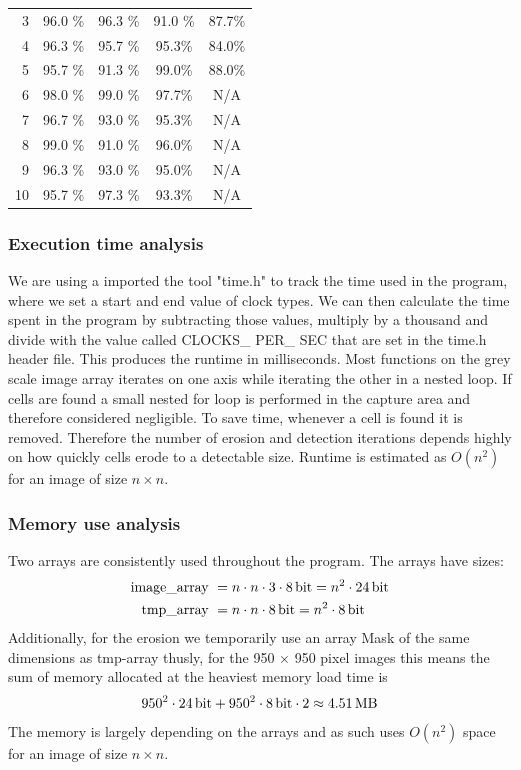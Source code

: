 \documentclass[a4paper, english]{article}
\numberwithin{equation}{section}
\begin{document}
\begin{table}[H]
\begin{subtable}[t]{.49\textwidth}
\begin{tabular}{rcccc}
            3  & 96.0 \% & 96.3 \% & 91.0 \% & 87.7\%     \\
            4  & 96.3 \% & 95.7 \% & 95.3\%  & 84.0\%     \\
            5  & 95.7 \% & 91.3 \% & 99.0\%  & 88.0\%     \\
            6  & 98.0 \% & 99.0 \% & 97.7\%  & N/A        \\
            7  & 96.7 \% & 93.0 \% & 95.3\%  & N/A        \\
            8  & 99.0 \% & 91.0 \% & 96.0\%  & N/A        \\
            9  & 96.3 \% & 93.0 \% & 95.0\%  & N/A        \\
            10 & 95.7 \% & 97.3 \% & 93.3\%  & N/A        \\
        \end{tabular}
    \end{subtable}
\end{table}
\subsubsection{Execution time analysis}
We are using a imported the tool "time.h" to track the time used in the program, where we set a start and end value of clock types. We can then calculate the time spent in the program by subtracting those values, multiply by a thousand and divide with the value called CLOCKS\_ PER\_ SEC that are set in the time.h header file. This produces the runtime in milliseconds.\newline
Most functions on the grey scale image array iterates on one axis while iterating the other in a nested loop. If cells are found a small nested for loop is performed in the capture area and therefore considered negligible. To save time, whenever a cell is found it is removed. Therefore the number of erosion and detection iterations depends highly on how quickly cells erode to a detectable size.
Runtime is estimated as \(O(n^2)\) for an image of size \(n\times n\).
\subsubsection{Memory use analysis}\label{sec:mem}
Two arrays are consistently used throughout the program. The arrays have sizes:
\begin{align}
    \text{image\_array} \  & = n \cdot n \cdot 3 \cdot \SI{8}{\bit} = n^2 \cdot \SI{24}{\bit} \\
    \text{tmp\_array} \    & = n \cdot n \cdot \SI{8}{\bit} = n^2 \cdot \SI{8}{\bit}
\end{align}
Additionally, for the erosion we temporarily use an array Mask of the same dimensions as tmp-array thusly,
for the 950 \(\times\) 950 pixel images this means the sum of memory allocated at the heaviest memory load time is
\begin{align}
    950^2 \cdot \SI{24}{\bit} + 950^2 \cdot \SI{8}{\bit} \cdot 2  \approx \SI{4.51}{\mega\byte}
\end{align}
The memory is largely depending on the arrays and as such uses \(O(n^2)\) space for an image of size \(n\times n\).
\end{document}
